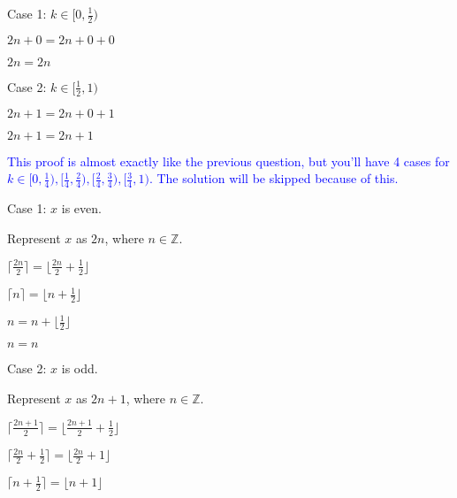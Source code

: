 \documentclass{exam}
\begin{document}
\begin{questions}
\begin{subparts}
\begin{center}
Case 1: \(k \in [0, \frac{1}{2}) \)

\( 2n + 0 = 2n + 0 + 0 \)

\( 2n = 2n\)
\vspace{5px}

Case 2: \(k \in [\frac{1}{2}, 1) \)

\( 2n + 1 = 2n + 0 + 1 \)

\( 2n + 1 = 2n + 1\)

\end{center}


\begin{center}

\textcolor{blue}{This proof is almost exactly like the previous question, but you'll have 4 cases for \(k \in [0, \frac{1}{4}), [\frac{1}{4}, \frac{2}{4}), [\frac{2}{4}, \frac{3}{4}), [\frac{3}{4}, 1)\). The solution will be skipped because of this.}

\end{center}

\newpage


\begin{center}

Case 1: \(x\) is even.

Represent \(x\) as \(2n\), where \(n \in \mathbb{Z}\).

\( \lceil \frac{2n}{2} \rceil = \lfloor \frac{2n}{2} + \frac{1}{2} \rfloor \)

\( \lceil n \rceil = \lfloor n + \frac{1}{2} \rfloor \)

\( n = n + \lfloor \frac{1}{2} \rfloor \)

\( n = n \)
\vspace{5px}

Case 2: \(x\) is odd.

Represent \(x\) as \(2n + 1\), where \(n \in \mathbb{Z}\).

\( \lceil \frac{2n+1}{2} \rceil = \lfloor \frac{2n+1}{2} + \frac{1}{2} \rfloor \)

\( \lceil \frac{2n}{2} + \frac{1}{2} \rceil = \lfloor \frac{2n}{2} + 1 \rfloor \)

\( \lceil n + \frac{1}{2} \rceil = \lfloor n + 1 \rfloor \)


\end{center}
\end{subparts}
\end{questions}
\end{document}
